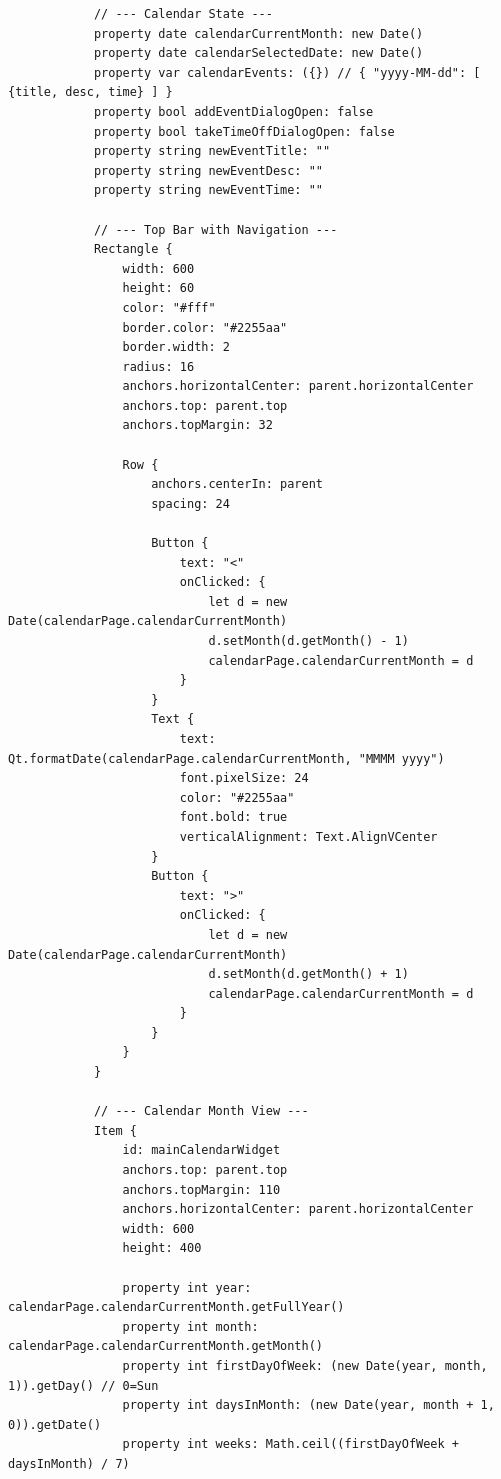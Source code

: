 \documentclass{report}
\begin{document}
\begin{lstlisting}
            // --- Calendar State ---
            property date calendarCurrentMonth: new Date()
            property date calendarSelectedDate: new Date()
            property var calendarEvents: ({}) // { "yyyy-MM-dd": [ {title, desc, time} ] }
            property bool addEventDialogOpen: false
            property bool takeTimeOffDialogOpen: false
            property string newEventTitle: ""
            property string newEventDesc: ""
            property string newEventTime: ""

            // --- Top Bar with Navigation ---
            Rectangle {
                width: 600
                height: 60
                color: "#fff"
                border.color: "#2255aa"
                border.width: 2
                radius: 16
                anchors.horizontalCenter: parent.horizontalCenter
                anchors.top: parent.top
                anchors.topMargin: 32

                Row {
                    anchors.centerIn: parent
                    spacing: 24

                    Button {
                        text: "<"
                        onClicked: {
                            let d = new Date(calendarPage.calendarCurrentMonth)
                            d.setMonth(d.getMonth() - 1)
                            calendarPage.calendarCurrentMonth = d
                        }
                    }
                    Text {
                        text: Qt.formatDate(calendarPage.calendarCurrentMonth, "MMMM yyyy")
                        font.pixelSize: 24
                        color: "#2255aa"
                        font.bold: true
                        verticalAlignment: Text.AlignVCenter
                    }
                    Button {
                        text: ">"
                        onClicked: {
                            let d = new Date(calendarPage.calendarCurrentMonth)
                            d.setMonth(d.getMonth() + 1)
                            calendarPage.calendarCurrentMonth = d
                        }
                    }
                }
            }

            // --- Calendar Month View ---
            Item {
                id: mainCalendarWidget
                anchors.top: parent.top
                anchors.topMargin: 110
                anchors.horizontalCenter: parent.horizontalCenter
                width: 600
                height: 400
            
                property int year: calendarPage.calendarCurrentMonth.getFullYear()
                property int month: calendarPage.calendarCurrentMonth.getMonth()
                property int firstDayOfWeek: (new Date(year, month, 1)).getDay() // 0=Sun
                property int daysInMonth: (new Date(year, month + 1, 0)).getDate()
                property int weeks: Math.ceil((firstDayOfWeek + daysInMonth) / 7)
            

\end{lstlisting}
\end{document}
